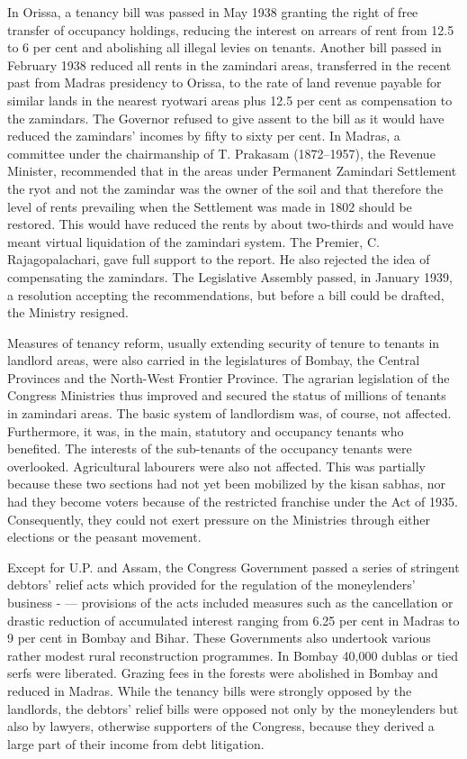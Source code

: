 \begin{multicols}{2}
In Orissa, a tenancy bill was passed in May 1938 granting the right of free transfer of occupancy holdings, reducing the interest on arrears of rent from 12.5 to 6 per cent and abolishing all illegal levies on tenants. Another bill passed in February 1938 reduced all rents in the zamindari areas, transferred in the recent past from Madras presidency to Orissa, to the rate of land revenue payable for similar lands in the nearest ryotwari areas plus 12.5 per cent as compensation to the zamindars. The Governor refused to give assent to the bill as it would have reduced the zamindars' incomes by fifty to sixty per cent. In Madras, a committee under the chairmanship of T. Prakasam (1872--1957), the Revenue Minister, recommended that in the areas under Permanent Zamindari Settlement the ryot and not the zamindar was the owner of the soil and that therefore the level of rents prevailing when the Settlement was made in 1802 should be restored. This would have reduced the rents by about two-thirds and would have meant virtual liquidation of the zamindari system. The Premier, C. Rajagopalachari, gave full support to the report. He also rejected the idea of compensating the zamindars. The Legislative Assembly passed, in January 1939, a resolution accepting the recommendations, but before a bill could be drafted, the Ministry resigned. 

Measures of tenancy reform, usually extending security of tenure to tenants in landlord areas, were also carried in the legislatures of Bombay, the Central Provinces and the North-West Frontier Province. The agrarian legislation of the Congress Ministries thus improved and secured the status of millions of tenants in zamindari areas. The basic system of landlordism was, of course, not affected. Furthermore, it was, in the main, statutory and occupancy tenants who benefited. The interests of the sub-tenants of the occupancy tenants were overlooked. Agricultural labourers were also not affected. This was partially because these two sections had not yet been mobilized by the kisan sabhas, nor had they become voters because of the restricted franchise under the Act of 1935. Consequently, they could not exert pressure on the Ministries through either elections or the peasant movement. 

Except for U.P. and Assam, the Congress Government passed a series of stringent debtors' relief acts which provided for the regulation of the moneylenders' business - --- provisions of the acts included measures such as the cancellation or drastic reduction of accumulated interest ranging from 6.25 per cent in Madras to 9 per cent in Bombay and Bihar. These Governments also undertook various rather modest rural reconstruction programmes. In Bombay 40,000 dublas or tied serfs were liberated. Grazing fees in the forests were abolished in Bombay and reduced in Madras. While the tenancy bills were strongly opposed by the landlords, the debtors' relief bills were opposed not only by the moneylenders but also by lawyers, otherwise supporters of the Congress, because they derived a large part of their income from debt litigation.


\end{multicols}
